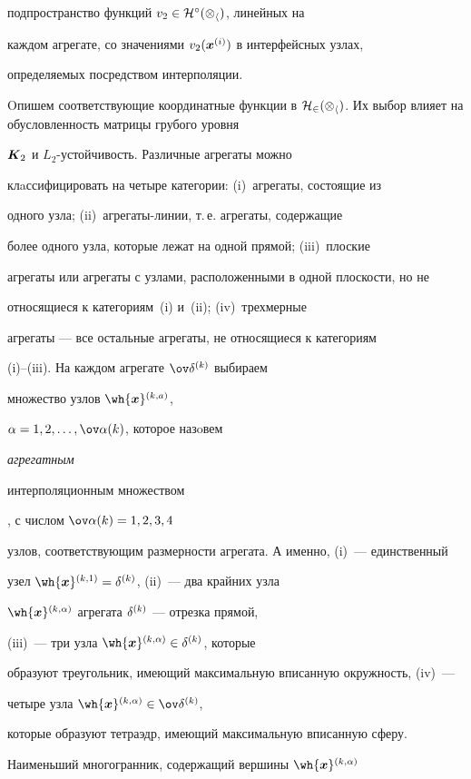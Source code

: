 подпространство функций $v_2\in\cal H^\circ(\Omega_h)$, линейных на


каждом агрегате, со значениями $v_2(\boldsymbol x^{(i)})$ в интерфейсных узлах,


определяемых посредством интерполяции.





Oпишем соответствующие координатные функции в $\cal


H_2(\Omega_h)$. Их выбор влияет на обусловленность матрицы грубого уровня


$\boldsymbol K_2$ и $L_2$-устойчивость. Различные агрегаты можно


клaссифицировать на четыре категории: (i)~агрегаты, состоящие из


одного узла; (ii)~агрегаты-линии, т.\,е. агрегаты, содержащие


более одного узла, которые лежат на одной прямой; (iii)~плоские


агрегаты или агрегаты с узлами, расположенными в одной плоскости, но не


относящиеся к категориям~(i) и~(ii); (iv)~трехмерные


агрегаты --- все остальные агрегаты, не относящиеся к категориям


(i)--(iii). На каждом агрегате $\ov\delta\up k$ выбираем


множество узлов $\wh{\bi x}\upp k a$,


$\alpha=1,2,\dotsc,\ov\alpha(k)$, которое назoвем {\em агрегатным


интерполяционным множеством}, с числом $\ov\alpha(k)=1,2,3,4$


узлов, соответствующим размерности агрегата. А именно, (i)~--- единственный


узел $\wh{\bi x}\upp k 1=\delta\up k$, (ii)~--- два крайних узла


$\wh{\bi x}\upp k \alpha$ агрегата ${\delta}^{(k)}$ --- отрезка прямой,


(iii)~--- три узла $\wh{\bi x}\upp{k}{\alpha}\in\delta\up k$, которые


образуют треугольник, имеющий максимальную вписанную окружность, (iv)~---


четыре узла $\wh{\bi x}\upp{k}{\alpha}\in\ov\delta\up k$,


которые образуют тетраэдр, имеющий максимальную вписанную сферу.


Наименьший многогранник, содержащий вершины $\wh{\bi x}\upp{k}{\alpha}$


